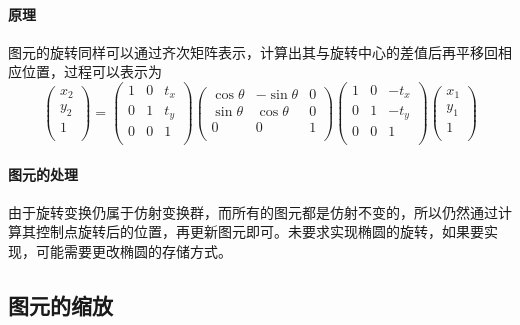 \documentclass[a4paper,UTF8]{article}
\theoremstyle{definition}
\begin{document}
\paragraph{原理} 图元的旋转同样可以通过齐次矩阵表示，计算出其与旋转中心的差值后再平移回相应位置，过程可以表示为
\begin{equation}
\left(
\begin{array}{c}
x_2 \\
y_2 \\
1 \\
\end{array}
\right)
=
\left(
\begin{array}{ccc}
1 & 0 & t_x \\
0 & 1 & t_y \\
0 & 0 & 1 \\
\end{array}
\right)
\left(
\begin{array}{ccc}
\cos\theta & -\sin\theta & 0 \\
\sin\theta & \cos\theta & 0 \\
0 & 0 & 1 \\
\end{array}
\right)
\left(
\begin{array}{ccc}
1 & 0 & -t_x \\
0 & 1 & -t_y \\
0 & 0 & 1 \\
\end{array}
\right)
\left(
\begin{array}{c}
x_1 \\
y_1 \\
1 \\
\end{array}
\right)
\end{equation}
\paragraph{图元的处理} 由于旋转变换仍属于仿射变换群，而所有的图元都是仿射不变的，所以仍然通过计算其控制点旋转后的位置，再更新图元即可。未要求实现椭圆的旋转，如果要实现，可能需要更改椭圆的存储方式。
\subsection{图元的缩放}
\end{document}
